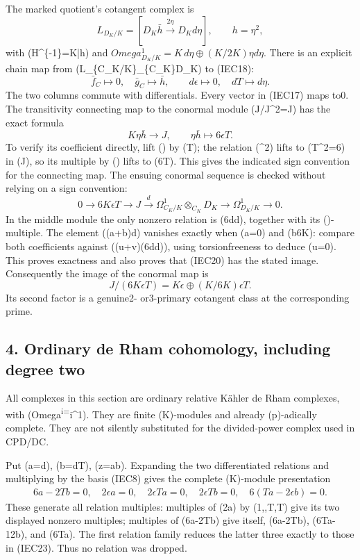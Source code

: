 \documentclass[
]{article}
\begin{document}
The marked quotient's cotangent complex is \[
L_{D_K/K}=[D_K\bar h\xrightarrow{2\eta}D_Kd\eta],\qquad h=\eta^2,
\tag{IEC18}
\] with (H\^{}\{-1\}=K\eta\bar h) and
\(Omega^1_{D_K/K}=K\,d\eta\oplus(K/2K)\eta d\eta\). There is an explicit
chain map from (L\_\{C\_K/K\}\otimes\_\{C\_K\}D\_K) to (IEC18): \[
\bar f_C\mapsto0,\quad\bar g_C\mapsto\bar h,
\qquad d\epsilon\mapsto0,\quad dT\mapsto d\eta.
\tag{IEC19}
\] The two columns commute with differentials. Every vector in (IEC17)
maps to0. The transitivity connecting map to the conormal module
(J/J\^{}2=J) has the exact formula \[
K\eta\bar h\longrightarrow J,\qquad
\eta\bar h\longmapsto6\epsilon T.
\tag{IEC20}
\] To verify its coefficient directly, lift (\eta) by (T); the relation
(\eta\^{}2) lifts to (T\^{}2=6\epsilon) in (J), so its multiple by
(\eta) lifts to (6\epsilon T). This gives the indicated sign convention
for the connecting map. The ensuing conormal sequence is checked without
relying on a sign convention: \[
0\longrightarrow6K\epsilon T\longrightarrow J
\xrightarrow{d} \Omega^1_{C_K/K}\otimes_{C_K}D_K
\longrightarrow\Omega^1_{D_K/K}\longrightarrow0.
\tag{IEC21}
\] In the middle module the only nonzero relation is
(6d\eta d), together with its (\eta)-multiple. The
element ((a+b\eta)d\epsilon) vanishes exactly when (a=0) and (b\in6K):
compare both coefficients against ((u+v\eta)(6d\eta d\eta)),
using torsionfreeness to deduce (u=0). This proves exactness and also
proves that (IEC20) has the stated image. Consequently the image of the
conormal map is \[
J/(6K\epsilon T)=K\epsilon\oplus(K/6K)\epsilon T.
\tag{IEC22}
\] Its second factor is a genuine2- or3-primary cotangent class at the
corresponding prime.

\subsection{4. Ordinary de Rham cohomology, including degree
two}\label{ordinary-de-rham-cohomology-including-degree-two}

All complexes in this section are ordinary relative Kähler de Rham
complexes, with (Omega\textsuperscript{i=\bigwedge}i\Omega\^{}1). They
are finite (K)-modules and already (p)-adically complete. They are not
silently substituted for the divided-power complex used in CPD/DC.

Put (a=d\epsilon), (b=dT), (z=a\wedge b). Expanding the two
differentiated relations and multiplying by the basis (IEC8) gives the
complete (K)-module presentation \[
\begin{gathered}
6a-2Tb=0,\quad 2\epsilon a=0,\quad2\epsilon T a=0,
\quad2\epsilon T b=0,\quad6(Ta-2\epsilon b)=0.
\end{gathered}
\tag{IEC23}
\] These generate all relation multiples: multiples of (2\epsilon a) by
(1,\epsilon,T,\epsilon T) give its two displayed nonzero multiples;
multiples of (6a-2Tb) give itself, (6\epsilon a-2\epsilon Tb),
(6Ta-12\epsilon b), and (6\epsilon Ta). The first relation family
reduces the latter three exactly to those in (IEC23). Thus no relation
was dropped.
\end{document}
